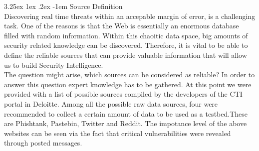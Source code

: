 \documentclass[12pt]{article}
\makeatletter
\renewcommand\paragraph{\@startsection{paragraph}{5}{\z@}%
  {3.25ex \@plus1ex \@minus.2ex}%
  {-1em}%
  {\normalfont\normalsize\bfseries}}
\makeatother
\begin{document}


\paragraph{Source Definition}
\hfill \break \\
Discovering real time threats within an accepable margin of error, is a challenging task. One of the reasons is that the Web is essentially an enormous database filled with random information. Within this chaoitic data space, big amounts of security related knowledge can be discovered. Therefore, it is vital to be able to define the reliable sources that can provide valuable information that will allow us to build Security Intelligence. 
\hfill \break \\
The question might arise, which sources can be considered as reliable? In order to answer this question expert knowledge has to be gathered. At this point we were provided with a list of possible sources compiled by the developers of the CTI portal in Deloitte. Among all the possible raw data sources, four were recommended to collect a certain amount of data to be used as a testbed.These are Phishtank, Pastebin, Twitter and Reddit. The impotance level of the above websites can be seen via the fact that critical vulnerabilities were revealed through posted messages\cite{list-2015-attacks}.\\
\end{document}
